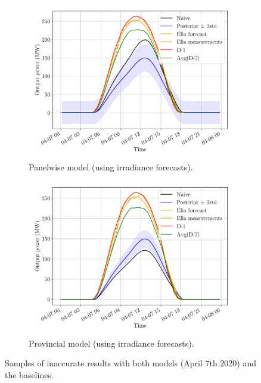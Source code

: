 \documentclass[a4paper, 12pt]{article}
\begin{document}
\begin{figure}[H]
	\centering
	\begin{subfigure}{0.48\textwidth}
		\centering
		\includegraphics[width=\textwidth]{resources/pdf/solar_panelwise (START_FOR 07-04-2020).pdf}
		\caption{Panelwise model (using irradiance forecasts).}
		\label{fig:panelwise_bad_2}
	\end{subfigure}
	\hspace{0.5em}
	\begin{subfigure}{0.48\textwidth}
		\centering
		\includegraphics[width=\textwidth]{resources/pdf/solar_provincial (START_FOR 07-04-2020).pdf}
		\caption{Provincial model (using irradiance forecasts).}
		\label{fig:provincial_bad_2}
	\end{subfigure}
	\caption{Samples of inaccurate results with both models (April 7th 2020) and the baselines.}
	\label{fig:bad_results_april_7th}
\end{figure}
\end{document}
